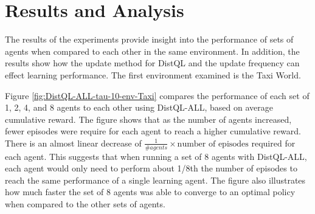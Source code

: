 \documentclass[jair,twoside,11pt,theapa]{article}
\begin{document}
\section{Results and Analysis}
\label{results}
The results of the experiments provide insight into the performance of sets of agents when compared to each other in the same environment. In addition, the results show how the update method for DistQL and the update frequency can effect learning performance. The first environment examined is the Taxi World. 

Figure \ref{fig:DistQL-ALL-tau-10-env-Taxi} compares the performance of each set of 1, 2, 4, and 8 agents to each other using DistQL-ALL, based on average cumulative reward. The figure shows that as the number of agents increased, fewer episodes were require for each agent to reach a higher cumulative reward. There is an almost linear decrease of $\frac{1}{\# agents} \times \text{number of episodes required}$ for each agent. This suggests that when running a set of 8 agents with DistQL-ALL, each agent would only need to perform about 1/8th the number of episodes to reach the same performance of a single learning agent. The figure also illustrates how much faster the set of 8 agents was able to converge to an optimal policy when compared to the other sets of agents.
\end{document}

